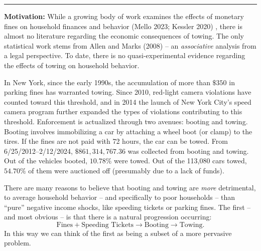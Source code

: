 \documentclass[12pt,letterpaper,doublespace, oneside]{article}
\begin{document}
\noindent\rule{\linewidth}{0.4pt}


\noindent\textbf{Motivation:} While a growing body of work examines the effects of monetary fines on household finances and behavior (Mello 2023; Kessler 2020) \cite{Mello} \cite{Kessler}, there is almost no literature regarding the economic consequences of towing. The only statistical work stems from Allen and Marks (2008) \cite{Allen} --  an \emph{associative} analysis from a legal perspective. To date, there is no quasi-experimental evidence regarding the effects of towing on household behavior.

In New York, since the early 1990s, the accumulation of more than $\$350$ in parking fines has warranted towing. Since 2010, red-light camera violations have counted toward this threshold, and in 2014 the launch of New York City's speed camera program further expanded the types of violations contributing to this threshold. Enforcement is actualized through two avenues: booting and towing. Booting involves immobilizing a car by attaching a wheel boot (or clamp) to the tires. If the fines are not paid with 72 hours, the car can be towed. From 6/25/2012--2/12/2024, $\$861,314,767.36$ was collected from booting and towing. Out of the vehicles booted, $10.78\%$ were towed. Out of the 113,080 cars towed, $54.70\%$ of them were auctioned off (presumably due to a lack of funds).

There are many reasons to believe that booting and towing are \emph{more} detrimental, to average household behavior -- and specifically to poor households -- than \enquote{pure} negative income shocks, like speeding tickets or parking fines. The first -- and most obvious -- is that there is a natural progression occurring: 
\begin{equation}
\text{Fines} + \text{Speeding Tickets} \to \text{Booting} \to \text{Towing}.
\end{equation}
In this way we can think of the first as being a subset of a more pervasive problem.
\end{document}
